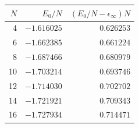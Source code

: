 \begin{tabular}{rrr}
\toprule
$N$ & $E_0/N$ & $(E_0/N - \epsilon_\infty) N$ \\
\midrule
4 & $-1.616025$ & $0.626253$ \\
6 & $-1.662385$ & $0.661224$ \\
8 & $-1.687466$ & $0.680979$ \\
10 & $-1.703214$ & $0.693746$ \\
12 & $-1.714030$ & $0.702702$ \\
14 & $-1.721921$ & $0.709343$ \\
16 & $-1.727934$ & $0.714471$ \\
\bottomrule
\end{tabular}
